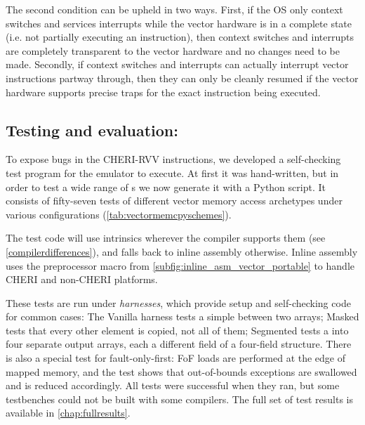 The second condition can be upheld in two ways.
First, if the OS only context switches and services interrupts while the vector hardware is in a complete state (i.e. not partially executing an instruction), then context switches and interrupts are completely transparent to the vector hardware and no changes need to be made.
Secondly, if context switches and interrupts can actually interrupt vector instructions partway through, then they can only be cleanly resumed if the vector hardware supports precise traps for the exact instruction being executed.

\subsection{Testing and evaluation: }\label{chap:software:eval}
To expose bugs in the CHERI-RVV instructions, we developed a self-checking test program for the emulator to execute.
At first it was hand-written, but in order to test a wide range of s we now generate it with a Python script.
It consists of fifty-seven tests of different vector memory access archetypes under various configurations (\cref{tab:vectormemcpyschemes}).

The test code will use intrinsics wherever the compiler supports them (see \cref{compilerdifferences}), and falls back to inline assembly otherwise.
Inline assembly uses the preprocessor macro from \cref{subfig:inline_asm_vector_portable} to handle CHERI and non-CHERI platforms.

These tests are run under \emph{harnesses}, which provide setup and self-checking code for common cases:
The Vanilla harness tests a simple  between two arrays;
Masked tests that every other element is copied, not all of them;
Segmented tests a  into four separate output arrays, each a different field of a four-field structure.
There is also a special test for fault-only-first: FoF loads are performed at the edge of mapped memory, and the test shows that out-of-bounds exceptions are swallowed and  is reduced accordingly.
All tests were successful when they ran, but some testbenches could not be built with some compilers.
The full set of test results is available in \cref{chap:fullresults}.

